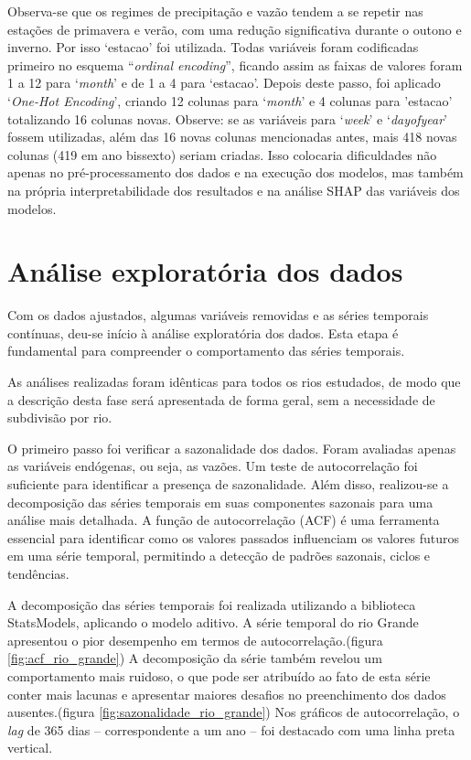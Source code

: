 Observa-se que os regimes de precipitação e vazão tendem a se repetir nas estações de primavera e verão, com uma redução significativa durante o outono e inverno. Por isso `estacao' foi utilizada. Todas variáveis foram codificadas primeiro no esquema ``\textit{ordinal encoding}'', ficando assim as faixas de valores foram 1 a 12 para `\textit{month}' e de 1 a 4 para `estacao'. Depois deste passo, foi aplicado `\textit{One-Hot Encoding}', criando 12 colunas para `\textit{month}' e 4 colunas para 'estacao' totalizando 16 colunas novas. Observe: se as variáveis para `\textit{week}' e `\textit{dayofyear}' fossem utilizadas, além das 16 novas colunas mencionadas antes, mais 418 novas colunas (419 em ano bissexto) seriam criadas. Isso colocaria dificuldades não apenas no pré-processamento dos dados e na execução dos modelos, mas também na própria interpretabilidade dos resultados e na análise SHAP das variáveis dos modelos.

\section{Análise exploratória dos dados}

Com os dados ajustados, algumas variáveis removidas e as séries temporais contínuas, deu-se início à análise exploratória dos dados. Esta etapa é fundamental para compreender o comportamento das séries temporais.

As análises realizadas foram idênticas para todos os rios estudados, de modo que a descrição desta fase será apresentada de forma geral, sem a necessidade de subdivisão por rio.

O primeiro passo foi verificar a sazonalidade dos dados. Foram avaliadas apenas as variáveis endógenas, ou seja, as vazões. Um teste de autocorrelação foi suficiente para identificar a presença de sazonalidade. Além disso, realizou-se a decomposição das séries temporais em suas componentes sazonais para uma análise mais detalhada. A função de autocorrelação (ACF) é uma ferramenta essencial para identificar como os valores passados influenciam os valores futuros em uma série temporal, permitindo a detecção de padrões sazonais, ciclos e tendências.

A decomposição das séries temporais foi realizada utilizando a biblioteca StatsModels, aplicando o modelo aditivo.\cite{seabold2010statsmodels} A série temporal do rio Grande apresentou o pior desempenho em termos de autocorrelação.(figura \ref{fig:acf_rio_grande}) A decomposição da série também revelou um comportamento mais ruidoso, o que pode ser atribuído ao fato de esta série conter mais lacunas e apresentar maiores desafios no preenchimento dos dados ausentes.(figura \ref{fig:sazonalidade_rio_grande}) Nos gráficos de autocorrelação, o \textit{lag} de 365 dias – correspondente a um ano – foi destacado com uma linha preta vertical.

